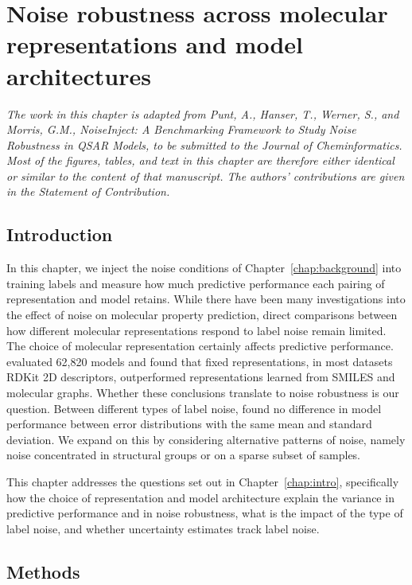 \chapter{Noise robustness across molecular representations and model architectures}\label{chap:robustness}

\textit{The work in this chapter is adapted from Punt, A., Hanser, T., Werner, S., and Morris, G.M., NoiseInject: A Benchmarking Framework to Study Noise Robustness in QSAR Models, to be submitted to the Journal of Cheminformatics. Most of the figures, tables, and text in this chapter are therefore either identical or similar to the content of that manuscript. The authors' contributions are given in the Statement of Contribution.}

\section{Introduction}


In this chapter, we inject the noise conditions of Chapter~\ref{chap:background} into training labels and measure how much predictive performance each pairing of representation and model retains. While there have been many investigations into the effect of noise on molecular property prediction, direct comparisons between how different molecular representations respond to label noise remain limited. The choice of molecular representation certainly affects predictive performance. \citet{Deng2023} evaluated 62,820 models and found that fixed representations, in most datasets RDKit 2D descriptors, outperformed representations learned from SMILES and molecular graphs. Whether these conclusions translate to noise robustness is our question. Between different types of label noise, \citet{Heid2023} found no difference in model performance between error distributions with the same mean and standard deviation. We expand on this by considering alternative patterns of noise, namely noise concentrated in structural groups or on a sparse subset of samples.

This chapter addresses the questions set out in Chapter~\ref{chap:intro}, specifically how the choice of representation and model architecture explain the variance in predictive performance and in noise robustness, what is the impact of the type of label noise, and whether uncertainty estimates track label noise.

\section{Methods}\label{sec:robustness:methods}

